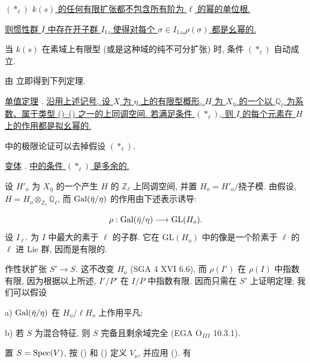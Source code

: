 $(*_\ell)$ \quad \underline{$k(s)$ 的任何有限扩张都不包含所有阶为 $\ell$ 的幂的单位根.}


\underline{则惯性群 $I$ 中存在开子群 $I_1$, 使得对每个 $\sigma\in I_1$, $\rho(\sigma)$ 都是幺幂的.}

当 $k(s)$ 在素域上有限型 (或是这种域的纯不可分扩张) 时, 条件 $(*_\ell)$ 自动成立.

由  立即得到下列定理.

\underline{单值定理} . \underline{沿用上述记号, 设 $X$ 为 $\eta$ 上的有限型概形, $H$ 为 $X_{\bar\eta}$ 的一个以 $\mathbb{Q}_\ell$ 为系数、属于类型 ()--() 之一的上同调空间. 若满足条件 $(*_\ell)$, 则 $I$ 的每个元素在 $H$ 上的作用都是拟幺幂的.}

 中的极限论证可以去掉假设 $(*_\ell)$.

\underline{变体} . \underline{ 中的条件 $(*_\ell)$ 是多余的.}

设 $H'_o$ 为 $X_{\bar\eta}$ 的一个产生 $H$ 的 $\mathbb{Z}_\ell$ 上同调空间, 并置 $H_o=H'_o/\text{挠子模}$. 由假设,
$H=H_o\otimes_{\mathbb{Z}_\ell}\mathbb{Q}_\ell$, 而 $\operatorname{Gal}(\bar\eta/\eta)$ 的作用由下述表示诱导:

\begin{equation*}
\rho:\operatorname{Gal}(\bar\eta/\eta)\longrightarrow\mathrm{GL}(H_o).
\end{equation*}
设 $I_{\ell'}$ 为 $I$ 中最大的素于 $\ell$ 的子群. 它在 $\mathrm{GL}(H_o)$ 中的像是一个阶素于 $\ell$ 的 $\ell$ 进 Lie 群, 因而是有限的.

作性状扩张 $S'\longrightarrow S$. 这不改变 $H_o$ (SGA 4 XVI 6.6), 而 $\rho(I')$ 在 $\rho(I)$ 中指数有限, 因为根据以上所述, $I'/P'$ 在 $I/P$ 中指数有限. 因而只需在 $S'$ 上证明定理; 我们可以假设

a) $\operatorname{Gal}(\bar\eta/\eta)$ 在 $H_o/\ell H_o$ 上作用平凡;

b) 若 $S$ 为混合特征, 则 $S$ 完备且剩余域完全 (EGA $\mathrm{O}_{III}$ 10.3.1).

置 $S=\operatorname{Spec}(V)$, 按 () 和 () 定义 $V_o$, 并应用 (). 有

